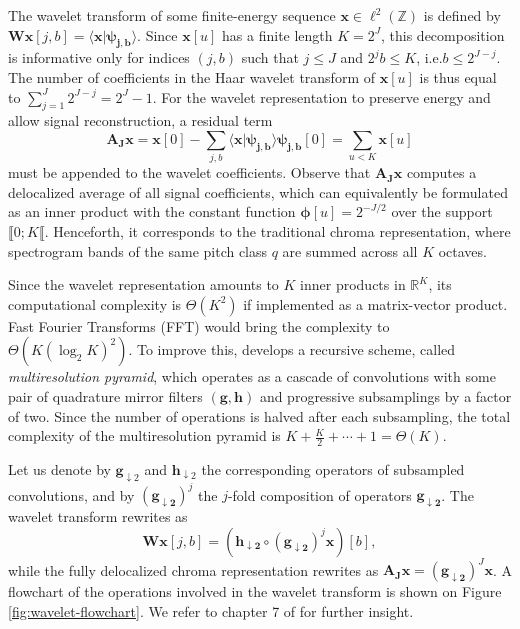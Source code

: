 \documentclass{article}
\makeatletter
\newcommand*{\ie}{i.e.\@\xspace}
\makeatother
\begin{document}
The wavelet transform of some finite-energy sequence
$\boldsymbol{x} \in \ell^2(\mathbb{Z})$ is defined by
$\mathbf{W} \boldsymbol{x}[j, b]
= \langle \boldsymbol{x} \vert \boldsymbol{\psi_{j,b}} \rangle$.
Since $\boldsymbol{x}[u]$ has a finite length $K = 2^J$,
this decomposition is informative only for indices $(j, b)$
such that $j \leq J$ and $2^j b \leq K$, \ie $b\leq2^{J-j}$.
The number of coefficients in the Haar wavelet transform of $\boldsymbol{x}[u]$ is thus equal to
$\sum_{j =1}^{J} 2^{J-j} = 2^J - 1$. For the wavelet representation to
preserve energy and allow signal reconstruction, a residual term
\begin{equation}
\boldsymbol{\mathbf{A}_J} \boldsymbol{x}
= \boldsymbol{x}[0] -
\sum_{j,b}
\langle \boldsymbol{x} \vert \boldsymbol{\psi_{j,b}} \rangle \boldsymbol{\psi_{j,b}}[0]
= \sum_{u<K} \boldsymbol{x}[u]
\label{eq:lowpass-term}
\end{equation}
must be appended to the wavelet coefficients.
Observe that $\boldsymbol{\mathbf{A}_J}  \boldsymbol{x}$
computes a delocalized average of all signal coefficients,
which can equivalently be formulated as an inner product with the constant
function $\boldsymbol{\phi}[u] = 2^{-J/2}$ over the support $\llbracket 0 ; K \llbracket$.
Henceforth, it corresponds to the traditional chroma representation, where spectrogram bands
of the same pitch class $q$ are summed across all $K$ octaves.

Since the wavelet representation amounts to $K$ inner products in $\mathbb{R}^K$,
its computational complexity is $\Theta(K^2)$ if implemented as a matrix-vector product.
Fast Fourier Transforms (FFT) would bring the complexity to
$\Theta{(K (\log_2 K)^2)}$.
To improve this, \cite{mallat1989theory} develops a recursive scheme, called
\emph{multiresolution pyramid}, which operates as a cascade
of convolutions with some pair of quadrature mirror filters
$(\boldsymbol{g}, \boldsymbol{h})$ and progressive subsamplings by a factor of two.
Since the number of operations is halved after each subsampling, the total
complexity of the multiresolution pyramid is $K + \frac{K}{2} + \cdots + 1 = \Theta(K)$.

Let us denote by $\boldsymbol{g}_{\downarrow 2}$ and
$\boldsymbol{h}_{\downarrow 2}$ the corresponding operators of subsampled
convolutions, and by $(\boldsymbol{g_{\downarrow 2}})^j$ the $j$-fold composition
of operators $\boldsymbol{g_{\downarrow 2}}$.
The wavelet transform rewrites as
\begin{equation}
\mathbf{W}\boldsymbol{x}[j,b] =
\left(
\boldsymbol{h_{\downarrow 2}} \circ
(\boldsymbol{g_{\downarrow 2}})^j \boldsymbol{x}
\right)[b],
\end{equation}
while the fully delocalized chroma representation rewrites as
$\boldsymbol{\mathbf{A}_J} \boldsymbol{x} =
(\boldsymbol{g_{\downarrow 2}})^J \boldsymbol{x}$.
A flowchart of the operations involved in the wavelet transform is shown on
Figure \ref{fig:wavelet-flowchart}.
We refer to chapter 7 of \cite{mallat2008wavelet}
for further insight.
\end{document}
